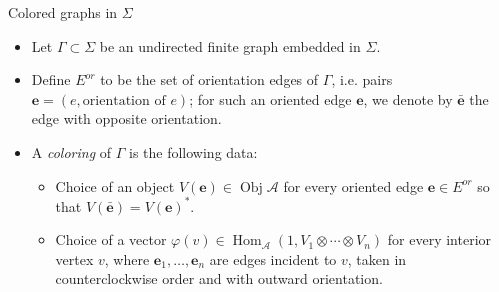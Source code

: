 \documentclass{beamer}
\newcommand{\ph}{\varphi}
\newcommand{\ee}{\mathbf{e}}
\DeclareMathOperator{\Obj}{Obj}
\DeclareMathOperator{\Hom}{Hom}
\begin{document}
\begin{frame}{Colored graphs in $\Sigma$}
\begin{itemize}
\item Let $\Gamma \subset \Sigma$ be an undirected finite graph embedded in $\Sigma$.

\pause \item Define $E^{or}$ to be the set of orientation edges of $\Gamma$, i.e. pairs $\ee=(e,\text{orientation of } e)$; for such an oriented edge $\ee$, we denote by $\bar{\ee}$ the edge with opposite orientation. 

\pause \item A {\em coloring} of $\Gamma$ is the
following data: 
\begin{itemize}
    \item Choice of an object $V(\ee)\in \Obj \mathcal A$ for every oriented edge  $\ee \in E^{or}$ so that $V(\bar{\ee})=V(\ee)^*$.
    \pause \item Choice of a vector $\ph(v)\in \Hom_{\mathcal A}(1, V_1 \otimes \cdots \otimes V_n)$  for  every interior vertex $v$, where 
      $\ee_1, \dots, \ee_n$ are edges incident to $v$, taken in counterclockwise
      order and with outward orientation.
\end{itemize}
\end{itemize}
\end{frame}
\end{document}
